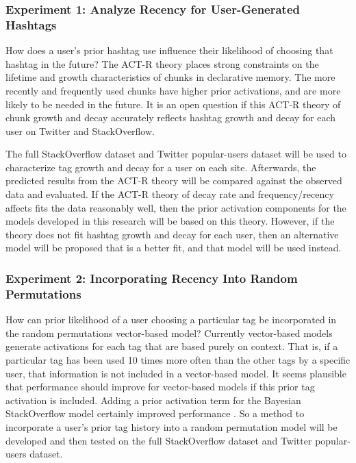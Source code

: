 \documentclass[man,floatsintext,donotrepeattitle]{apa6}
\begin{document}
\subsubsection{Experiment 1: Analyze Recency for User-Generated Hashtags}

How does a user's prior hashtag use influence their likelihood of choosing that hashtag in the future?
The ACT-R theory places strong constraints on the lifetime and growth characteristics of chunks in declarative memory.
The more recently and frequently used chunks have higher prior activations, and are more likely to be needed in the future.
It is an open question if this ACT-R theory of chunk growth and decay accurately reflects hashtag growth and decay for each user on Twitter and StackOverflow.

The full StackOverflow dataset and Twitter popular-users dataset will be used to characterize tag growth and decay for a user on each site.
Afterwards, the predicted results from the ACT-R theory will be compared against the observed data and evaluated.
If the ACT-R theory of decay rate and frequency/recency affects fits the data reasonably well, then the prior activation components for the models developed in this research will be based on this theory.
However, if the theory does not fit hashtag growth and decay for each user, then an alternative model will be proposed that is a better fit, and that model will be used instead.

\subsubsection{Experiment 2: Incorporating Recency Into Random Permutations}

How can prior likelihood of a user choosing a particular tag be incorporated in the random permutations vector-based model?
Currently vector-based models generate activations for each tag that are based purely on context.
That is, if a particular tag has been used 10 times more often than the other tags by a specific user, that information is not included in a vector-based model.
It seems plausible that performance should improve for vector-based models if this prior tag activation is included.
Adding a prior activation term for the Bayesian StackOverflow model certainly improved performance \parencite{Stanley2013}.
So a method to incorporate a user's prior tag history into a random permutation model will be developed and then tested on the full StackOverflow dataset and Twitter popular-users dataset.
\end{document}
